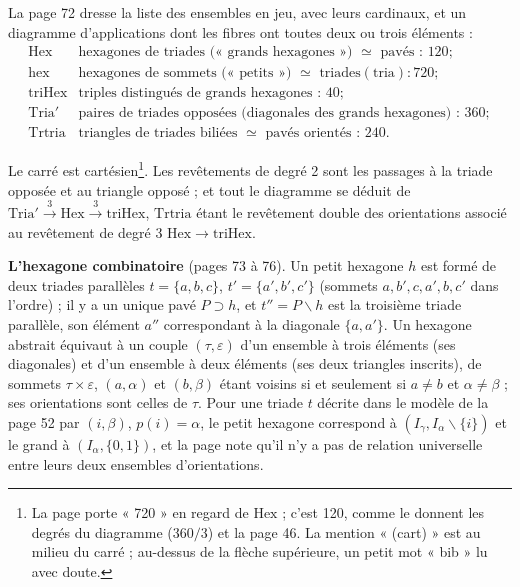 \documentclass[11pt,a4paper]{article}
\begin{document}
La page 72 dresse la liste des ensembles en jeu, avec leurs cardinaux, et un
diagramme d'applications dont les fibres ont toutes deux ou trois éléments :
\[
\begin{array}{ll}
\mathrm{Hex} & \text{hexagones de triades (« grands hexagones ») } \simeq
\text{ pavés : } 120 ; \\
\mathrm{hex} & \text{hexagones de sommets (« petits ») } \simeq \text{ triades
} (\mathrm{tria}) : 720 ; \\
\mathrm{triHex} & \text{triples distingués de grands hexagones : } 40 ; \\
\mathrm{Tria}' & \text{paires de triades opposées (diagonales des grands
hexagones) : } 360 ; \\
\mathrm{Trtria} & \text{triangles de triades biliées } \simeq \text{ pavés
orientés : } 240 .
\end{array}
\]

Le carré est cartésien\footnote{La page porte « 720 » en regard de
$\mathrm{Hex}$ ; c'est 120, comme le donnent les degrés du diagramme ($360/3$)
et la page 46. La mention « (cart) » est au milieu du carré ; au-dessus de la
flèche supérieure, un petit mot « bib » lu avec doute.}. Les revêtements de
degré 2 sont les passages à la triade opposée et au triangle opposé ; et tout
le diagramme se déduit de $\mathrm{Tria}' \xrightarrow{3} \mathrm{Hex}
\xrightarrow{3} \mathrm{triHex}$, $\mathrm{Trtria}$ étant le revêtement double
des orientations associé au revêtement de degré 3 $\mathrm{Hex} \to
\mathrm{triHex}$.

\textbf{L'hexagone combinatoire} (pages 73 à 76). Un petit hexagone $h$ est
formé de deux triades parallèles $t = \lbrace a, b, c\rbrace$, $t' = \lbrace a',
b', c'\rbrace$ (sommets $a, b', c, a', b, c'$ dans l'ordre) ; il y a un unique
pavé $P \supset h$, et $t'' = P \smallsetminus h$ est la troisième triade
parallèle, son élément $a''$ correspondant à la diagonale $\lbrace a,
a'\rbrace$. Un hexagone abstrait équivaut à un couple $(\tau, \varepsilon)$
d'un ensemble à trois éléments (ses diagonales) et d'un ensemble à deux
éléments (ses deux triangles inscrits), de sommets $\tau \times \varepsilon$,
$(a, \alpha)$ et $(b, \beta)$ étant voisins si et seulement si $a \neq b$ et
$\alpha \neq \beta$ ; ses orientations sont celles de $\tau$. Pour une triade
$t$ décrite dans le modèle de la page 52 par $(i, \beta)$, $p(i) = \alpha$, le
petit hexagone correspond à $(I_\gamma, I_\alpha \smallsetminus \lbrace
i\rbrace)$ et le grand à $(I_\alpha, \lbrace 0, 1\rbrace)$, et la page note qu'il
n'y a pas de relation universelle entre leurs deux ensembles d'orientations.
\end{document}

